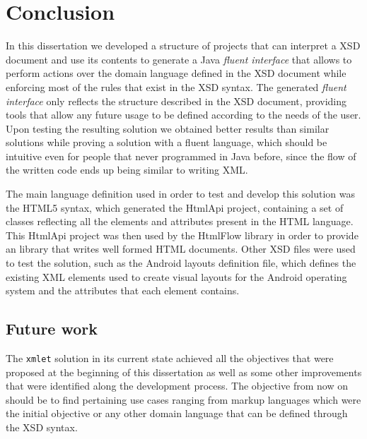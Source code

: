 \chapter{Conclusion}
\label{cha:conclusion}

In this dissertation we developed a structure of projects that can interpret a \ac{XSD} document and use its contents to generate a Java \textit{fluent interface} that allows to perform actions over the domain language defined in the \ac{XSD} document while enforcing most of the rules that exist in the \ac{XSD} syntax. The generated \textit{fluent interface} only reflects the structure described in the \ac{XSD} document, providing tools that allow any future usage to be defined according to the needs of the user. Upon testing the resulting solution we obtained better results than similar solutions while proving a solution with a fluent language, which should be intuitive even for people that never programmed in Java before, since the flow of the written code ends up being similar to writing \ac{XML}.

\noindent
The main language definition used in order to test and develop this solution was the \ac{HTML}5 syntax, which generated the HtmlApi project, containing a set of classes reflecting all the elements and attributes present in the \ac{HTML} language. This HtmlApi project was then used by the HtmlFlow library in order to provide an library that writes well formed \ac{HTML} documents. Other \ac{XSD} files were used to test the solution, such as the Android layouts definition file, which defines the existing \ac{XML} elements used to create visual layouts for the Android operating system and the attributes that each element contains.

\section{Future work}
\label{cha:futurework}

The \texttt{xmlet} solution in its current state achieved all the objectives that were proposed at the beginning of this dissertation as well as some other improvements that were identified along the development process. The objective from now on should be to find pertaining use cases ranging from markup languages which were the initial objective or any other domain language that can be defined through the \ac{XSD} syntax.